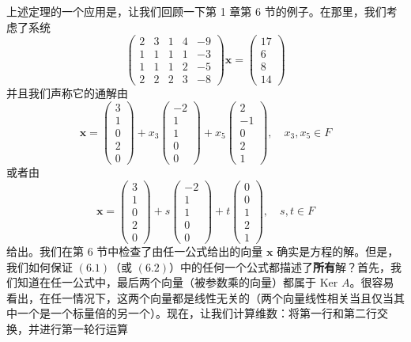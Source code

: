 上述定理的一个应用是，让我们回顾一下第 1 章第 6 节的例子。在那里，我们考虑了系统
$$
\begin{pmatrix} 2 & 3 & 1 & 4 & -9 \\ 1 & 1 & 1 & 1 & -3 \\ 1 & 1 & 1 & 2 & -5 \\ 2 & 2 & 2 & 3 & -8 \end{pmatrix} \mathbf{x} = \begin{pmatrix} 17 \\ 6 \\ 8 \\ 14 \end{pmatrix}
$$
并且我们声称它的通解由
$$
\mathbf{x} = \begin{pmatrix} 3 \\ 1 \\ 0 \\ 2 \\ 0 \end{pmatrix} + x_3 \begin{pmatrix} -2 \\ 1 \\ 1 \\ 0 \\ 0 \end{pmatrix} + x_5 \begin{pmatrix} 2 \\ -1 \\ 0 \\ 2 \\ 1 \end{pmatrix}, \quad x_3, x_5 \in F
$$
或者由
$$
\mathbf{x} = \begin{pmatrix} 3 \\ 1 \\ 0 \\ 2 \\ 0 \end{pmatrix} + s \begin{pmatrix} -2 \\ 1 \\ 1 \\ 0 \\ 0 \end{pmatrix} + t \begin{pmatrix} 0 \\ 0 \\ 1 \\ 2 \\ 1 \end{pmatrix}, \quad s, t \in F
$$
给出。我们在第 6 节中检查了由任一公式给出的向量 $\mathbf{x}$ 确实是方程的解。但是，我们如何保证 $(6.1)$（或 $(6.2)$）中的任何一个公式都描述了\textbf{所有}解？首先，我们知道在任一公式中，最后两个向量（被参数乘的向量）都属于 $\text{Ker } A$。很容易看出，在任一情况下，这两个向量都是线性无关的（两个向量线性相关当且仅当其中一个是一个标量倍的另一个）。现在，让我们计算维数：将第一行和第二行交换，并进行第一轮行运算
